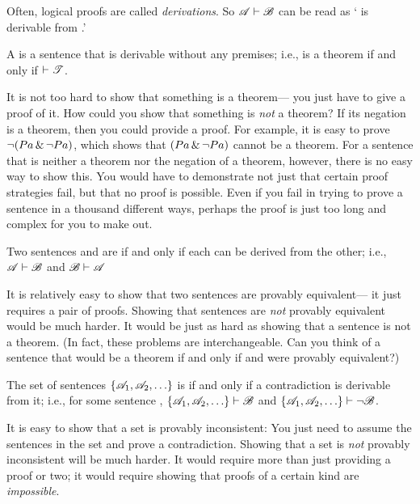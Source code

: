 Often, logical proofs are called \emph{derivations}. So $\mathscr{A}\vdash\mathscr{B}$ can be read as ` is derivable from .'

A  is a sentence that is derivable without any premises; i.e.,  is a theorem if and only if $\vdash\mathscr{T}$.

It is not too hard to show that something is a theorem--- you just have to give a proof of it. How could you show that something is \emph{not} a theorem? If its negation is a theorem, then you could provide a proof. For example, it is easy to prove $\neg(Pa \,\&\, \neg Pa)$, which shows that $(Pa \,\&\, \neg Pa)$ cannot be a theorem. For a sentence that is neither a theorem nor the negation of a theorem, however, there is no easy way to show this. You would have to demonstrate not just that certain proof strategies fail, but that no proof is possible. Even if you fail in trying to prove a sentence in a thousand different ways, perhaps the proof is just too long and complex for you to make out.

Two sentences  and  are  if and only if each can be derived from the other; i.e., $\mathscr{A}\vdash\mathscr{B}$ and $\mathscr{B}\vdash\mathscr{A}$

It is relatively easy to show that two sentences are provably equivalent--- it just requires a pair of proofs. Showing that sentences are \emph{not} provably equivalent would be much harder. It would be just as hard as showing that a sentence is not a theorem. (In fact, these problems are interchangeable. Can you think of a sentence that would be a theorem if and only if  and  were provably equivalent?)

The set of sentences $\{\mathscr{A}_1,\mathscr{A}_2,\ldots\}$ is  if and only if a contradiction is derivable from it; i.e., for some sentence , $\{\mathscr{A}_1,\mathscr{A}_2,\ldots\}\vdash\mathscr{B}$ and $\{\mathscr{A}_1,\mathscr{A}_2,\ldots\}\vdash\neg \mathscr{B}$.

It is easy to show that a set is provably inconsistent: You just need to assume the sentences in the set and prove a contradiction. Showing that a set is \emph{not} provably inconsistent will be much harder. It would require more than just providing a proof or two; it would require showing that proofs of a certain kind are \emph{impossible}.








